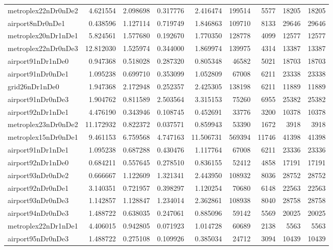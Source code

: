 \begin{longtable}{|l|r|r|r|r|r|r|r|r|}
metroplex22nDr0nDe2 & 4.621554 & 2.098698 & 0.317776 & 2.416474 & 199514 & 5577 & 18205 & 18205 \\
airport8nDr0nDe1 & 0.438596 & 1.127114 & 0.719749 & 1.846863 & 109710 & 8133 & 29646 & 29646 \\
metroplex20nDr1nDe1 & 5.824561 & 1.577680 & 0.192670 & 1.770350 & 128778 & 4099 & 12577 & 12577 \\
metroplex22nDr0nDe3 & 12.812030 & 1.525974 & 0.344000 & 1.869974 & 139975 & 4314 & 13387 & 13387 \\
airport91nDr1nDe0 & 0.947368 & 0.518028 & 0.287320 & 0.805348 & 46582 & 5021 & 18703 & 18703 \\
airport91nDr0nDe1 & 1.095238 & 0.699710 & 0.353099 & 1.052809 & 67008 & 6211 & 23338 & 23338 \\
grid26nDr1nDe0 & 1.947368 & 2.172948 & 0.252357 & 2.425305 & 138198 & 6211 & 11889 & 11889 \\
airport91nDr0nDe3 & 1.904762 & 0.811589 & 2.503564 & 3.315153 & 75260 & 6955 & 25382 & 25382 \\
airport92nDr1nDe1 & 4.476190 & 0.343946 & 0.108745 & 0.452691 & 33776 & 3200 & 10378 & 10378 \\
metroplex23nDr0nDe2 & 11.172932 & 0.822372 & 0.037571 & 0.859943 & 53390 & 1672 & 3918 & 3918 \\
metroplex15nDr0nDe1 & 9.461153 & 6.759568 & 4.747163 & 11.506731 & 569394 & 11746 & 41398 & 41398 \\
airport91nDr1nDe1 & 1.095238 & 0.687288 & 0.430476 & 1.117764 & 67008 & 6211 & 23336 & 23336 \\
airport92nDr1nDe0 & 0.684211 & 0.557645 & 0.278510 & 0.836155 & 52412 & 4858 & 17191 & 17191 \\
airport93nDr0nDe2 & 0.666667 & 1.122609 & 1.321341 & 2.443950 & 108932 & 8036 & 28752 & 28752 \\
airport92nDr0nDe1 & 3.140351 & 0.721957 & 0.398297 & 1.120254 & 70680 & 6148 & 22563 & 22563 \\
airport93nDr0nDe3 & 1.142857 & 1.128847 & 1.234014 & 2.362861 & 108938 & 8040 & 28758 & 28758 \\
airport94nDr0nDe3 & 1.488722 & 0.638035 & 0.247061 & 0.885096 & 59142 & 5569 & 20025 & 20025 \\
metroplex22nDr1nDe1 & 4.406015 & 0.942805 & 0.071923 & 1.014728 & 60689 & 2138 & 5563 & 5563 \\
airport95nDr0nDe3 & 1.488722 & 0.275108 & 0.109926 & 0.385034 & 24712 & 3094 & 10439 & 10439 \\

\end{longtable}
